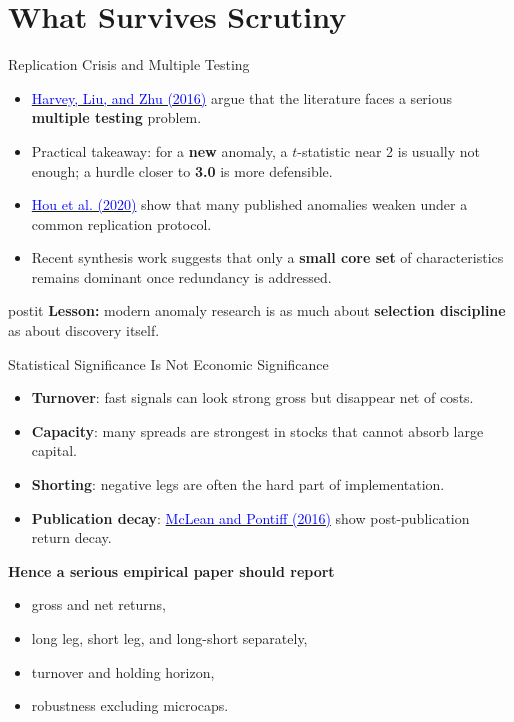 \documentclass{beamer}
\begin{document}
\section{What Survives Scrutiny}

\begin{frame}{Replication Crisis and Multiple Testing}
	\begin{itemize}
		\item \href{https://doi.org/10.1093/rfs/hhv059}{\textcolor{blue}{Harvey, Liu, and Zhu (2016)}} argue that the literature faces a serious \textbf{multiple testing} problem.
		\item Practical takeaway: for a \textbf{new} anomaly, a $t$-statistic near 2 is usually not enough; a hurdle closer to \textbf{3.0} is more defensible.
		\item \href{https://doi.org/10.1093/rfs/hhy131}{\textcolor{blue}{Hou et al. (2020)}} show that many published anomalies weaken under a common replication protocol.
		\item Recent synthesis work suggests that only a \textbf{small core set} of characteristics remains dominant once redundancy is addressed.
	\end{itemize}

	\vspace{0.3cm}
	\begin{beamercolorbox}[sep=0.4em,wd=\linewidth,rounded=true,shadow=true]{postit}
		\textbf{Lesson:} modern anomaly research is as much about \textbf{selection discipline} as about discovery itself.
	\end{beamercolorbox}
\end{frame}

\begin{frame}{Statistical Significance Is Not Economic Significance}
	\begin{itemize}
		\item \textbf{Turnover}: fast signals can look strong gross but disappear net of costs.
		\item \textbf{Capacity}: many spreads are strongest in stocks that cannot absorb large capital.
		\item \textbf{Shorting}: negative legs are often the hard part of implementation.
		\item \textbf{Publication decay}: \href{https://doi.org/10.1111/jofi.12365}{\textcolor{blue}{McLean and Pontiff (2016)}} show post-publication return decay.
	\end{itemize}

	\vspace{0.3cm}
	\textbf{Hence a serious empirical paper should report}
	\begin{itemize}
		\item gross and net returns,
		\item long leg, short leg, and long-short separately,
		\item turnover and holding horizon,
		\item robustness excluding microcaps.
	\end{itemize}
\end{frame}
\end{document}
